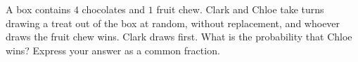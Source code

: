 A box contains $4$ chocolates and $1$ fruit chew. Clark and Chloe take turns drawing a treat out of the box at random, without replacement, and whoever draws the fruit chew wins. Clark draws first. What is the probability that Chloe wins? Express your answer as a common fraction.
